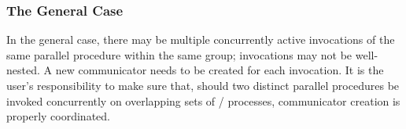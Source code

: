 \subsubsection{The General Case}
\label{sec:context:general-case}

In the general case, there may be multiple concurrently active
invocations of the same parallel procedure within the same group;
invocations may not be well-nested. A new communicator needs to be
created for each invocation. It is the user's responsibility to make
sure that, should two distinct parallel procedures be invoked
concurrently on overlapping sets of \MPI/ processes,
communicator creation
is properly coordinated.

